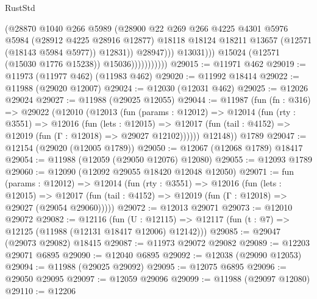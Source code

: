 \begin{lexlean}{RustStd}
\begin{coremodule}
                                      (@28870
                                        @1040
                                        @266
                                        @5989
                                        (@28900
                                          @22
                                          @269
                                          @266
                                          @4225
                                          @4301
                                          @5976
                                          @5984
                                          (@28912 @4225 @28916 @12877)
                                          @18118
                                          @18124
                                          @18211
                                          @13657
                                          (@12571 (@18143 @5984 @5977))
                                          @12831))
                                      @28947)))
                                @13031)))
                          @15024
                          (@12571 (@15030 @1776 @15238))
                          @15036)))))))))))
@29015 := @11971 @462
@29019 := @11973 (@11977 @462) (@11983 @462)
@29020 := @11992 @18414
@29022 := @11988 (@29020 @12007)
@29024 := @12030 (@12031 @462)
@29025 := @12026 @29024
@29027 := @11988 (@29025 @12055)
@29044 := @11987
    (fun (fn : @316) =>
    @29022
      (@12010
        (@12013
          (fun (params : @12012) =>
          @12014
            (fun (rty : @3551) =>
            @12016
              (fun (lets : @12015) =>
              @12017 (fun (tail : @4152) => @12019 (fun (Γ : @12018) => @29027 @12102))))))
        @12148))
    @1789
@29047 := @12154 (@29020 (@12005 @1789))
@29050 := @12067 (@12068 @1789) @18417
@29054 := @11988 (@12059 (@29050 @12076) @12080)
@29055 := @12093 @1789
@29060 := @12090 (@12092 @29055 @18420 @12048 @12050)
@29071 := fun (params : @12012) =>
  @12014
    (fun (rty : @3551) =>
    @12016
      (fun (lets : @12015) =>
      @12017 (fun (tail : @4152) => @12019 (fun (Γ : @12018) => @29027 (@29054 @29060)))))
@29072 := @12013 @29071
@29073 := @12010 @29072
@29082 := @12116
    (fun (U : @12115) => @12117 (fun (t : @7) => @12125 (@11988 (@12131 @18417 @12006) @12142)))
@29085 := @29047 (@29073 @29082) @18415
@29087 := @11973 @29072 @29082
@29089 := @12203 @29071 @6895
@29090 := @12040 @6895
@29092 := @12038 (@29090 @12053)
@29094 := @11988 (@29025 @29092)
@29095 := @12075 @6895
@29096 := @29050 @29095
@29097 := @12059 @29096
@29099 := @11988 (@29097 @12080)
@29110 := @12206

\end{coremodule}
\end{lexlean}
